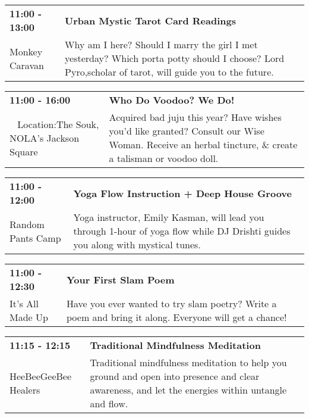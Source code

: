 \begin{tabular}{ p{1in} p{2.2in} }
    \textbf{11:00 - 13:00} & \textbf{Urban Mystic Tarot Card Readings} \\
    Monkey Caravan \newline  & Why am I here? Should I marry the girl I met yesterday? Which porta potty should I choose? Lord Pyro,scholar of tarot, will guide you to the future. \\
    \hline 
\end{tabular}
    
\begin{tabular}{ p{1in} p{2.2in} }
    \textbf{11:00 - 16:00} & \textbf{Who Do Voodoo? We Do!} \\
    ~ \newline Location:The Souk, NOLA's Jackson Square  & Acquired bad juju this year? Have wishes you'd like granted? Consult our Wise Woman. Receive an herbal tincture, \& create a talisman or voodoo doll. \\
    \hline 
\end{tabular}
    
\begin{tabular}{ p{1in} p{2.2in} }
    \textbf{11:00 - 12:00} & \textbf{Yoga Flow Instruction + Deep House Groove} \\
    Random Pants Camp \newline  & Yoga instructor, Emily Kasman, will lead you through 1-hour of yoga flow while DJ Drishti guides you along with mystical tunes. \\
    \hline 
\end{tabular}
    
\begin{tabular}{ p{1in} p{2.2in} }
    \textbf{11:00 - 12:30} & \textbf{Your First Slam Poem} \\
    It's All Made Up \newline  & Have you ever wanted to try slam poetry? Write a poem and bring it along. Everyone will get a chance! \\
    \hline 
\end{tabular}
    
\begin{tabular}{ p{1in} p{2.2in} }
    \textbf{11:15 - 12:15} & \textbf{Traditional Mindfulness Meditation} \\
    HeeBeeGeeBee Healers \newline  & Traditional mindfulness meditation to help you ground and open into presence and clear awareness, and let the energies within untangle and flow. \\
    \hline 
\end{tabular}
    
